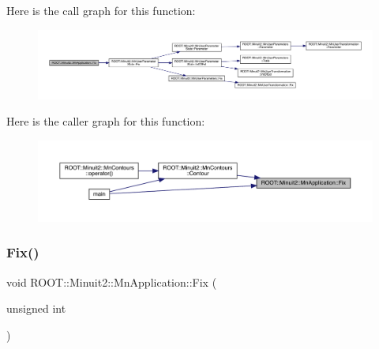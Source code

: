 Here is the call graph for this function\+:
\nopagebreak
\begin{figure}[H]
\begin{center}
\leavevmode
\includegraphics[width=350pt]{df/dd5/classROOT_1_1Minuit2_1_1MnApplication_a98bea1ca3fb2a311b1c0e72a58ec2d9f_cgraph}
\end{center}
\end{figure}
Here is the caller graph for this function\+:
\nopagebreak
\begin{figure}[H]
\begin{center}
\leavevmode
\includegraphics[width=350pt]{df/dd5/classROOT_1_1Minuit2_1_1MnApplication_a98bea1ca3fb2a311b1c0e72a58ec2d9f_icgraph}
\end{center}
\end{figure}
\mbox{\label{classROOT_1_1Minuit2_1_1MnApplication_a98bea1ca3fb2a311b1c0e72a58ec2d9f}} 
\subsubsection{\texorpdfstring{Fix()}{Fix()}\hspace{0.1cm}{\footnotesize\ttfamily [2/6]}}
{\footnotesize\ttfamily void R\+O\+O\+T\+::\+Minuit2\+::\+Mn\+Application\+::\+Fix (\begin{DoxyParamCaption}\item[{unsigned int}]{ }\end{DoxyParamCaption})}

\mbox{\label{classROOT_1_1Minuit2_1_1MnApplication_a98bea1ca3fb2a311b1c0e72a58ec2d9f}} 
